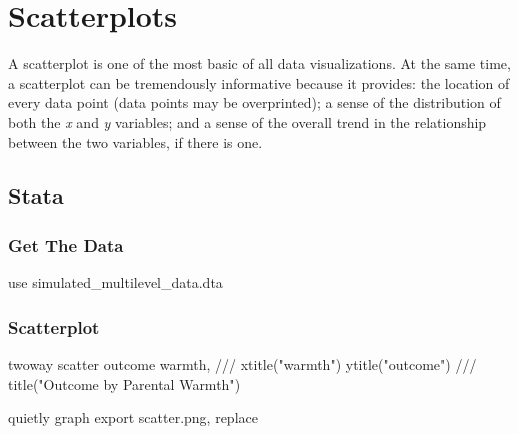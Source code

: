 \documentclass[
  letterpaper,
  DIV=11,
  numbers=noendperiod]{scrreprt}
\newenvironment{Shaded}{\begin{snugshade}}{\end{snugshade}}
\newcommand{\BaseNTok}[1]{\textcolor[rgb]{0.68,0.00,0.00}{#1}}
\newcommand{\CommentTok}[1]{\textcolor[rgb]{0.37,0.37,0.37}{#1}}
\newcommand{\KeywordTok}[1]{\textcolor[rgb]{0.00,0.23,0.31}{#1}}
\newcommand{\NormalTok}[1]{\textcolor[rgb]{0.00,0.23,0.31}{#1}}
\newcommand{\StringTok}[1]{\textcolor[rgb]{0.13,0.47,0.30}{#1}}
\begin{document}
\section{Scatterplots}\label{scatterplots}

A scatterplot is one of the most basic of all data visualizations. At
the same time, a scatterplot can be tremendously informative because it
provides: the location of every data point (data points may be
overprinted); a sense of the distribution of both the \emph{x} and
\emph{y} variables; and a sense of the overall trend in the relationship
between the two variables, if there is one.

\subsection{Stata}

\subsubsection{Get The Data}\label{get-the-data}

\begin{Shaded}
\begin{Highlighting}[]

\KeywordTok{use}\NormalTok{ simulated\_multilevel\_data.dta}
\end{Highlighting}
\end{Shaded}

\subsubsection{Scatterplot}\label{scatterplot}

\begin{Shaded}
\begin{Highlighting}[]
\KeywordTok{twoway} \KeywordTok{scatter}\NormalTok{ outcome warmth, }\CommentTok{///}
  \BaseNTok{xtitle}\NormalTok{(}\StringTok{"warmth"}\NormalTok{) }\BaseNTok{ytitle}\NormalTok{(}\StringTok{"outcome"}\NormalTok{) }\CommentTok{///}
  \BaseNTok{title}\NormalTok{(}\StringTok{"Outcome by Parental Warmth"}\NormalTok{) }

\KeywordTok{quietly} \KeywordTok{graph} \KeywordTok{export} \KeywordTok{scatter}\NormalTok{.png, }\KeywordTok{replace}
\end{Highlighting}
\end{Shaded}
\end{document}
